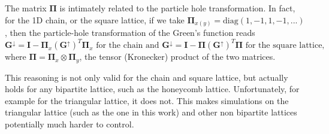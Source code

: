 The matrix $\bm \Pi$ is intimately related to the particle hole transformation.
In fact, for the \acs{1D} chain, or the square lattice, if we take $\bm \Pi_{x (y) } = \text{diag} ( 1, -1, 1, -1, ...)$, then the particle-hole transformation of the Green's function reads
\begin{equation}
\bm G^\downarrow = \bm I - \bm \Pi_x (\bm G^\uparrow)^T \bm \Pi_x \text{  for the chain} \,\, \text{and} \,\, \bm G^\downarrow = \bm I - \bm \Pi (\bm G^\uparrow)^T \bm \Pi \text{  for the square lattice} ,
\end{equation}
where $\bm \Pi = \bm \Pi_x \otimes \bm \Pi_y$, the tensor (Kronecker) product of the two matrices.

This reasoning is not only valid for the chain and square lattice, but actually holds for any bipartite lattice, such as the honeycomb lattice.
Unfortunately, for example for the triangular lattice, it does not.
This makes simulations on the triangular lattice (such as the one in this work) and other non bipartite lattices potentially much harder to control.